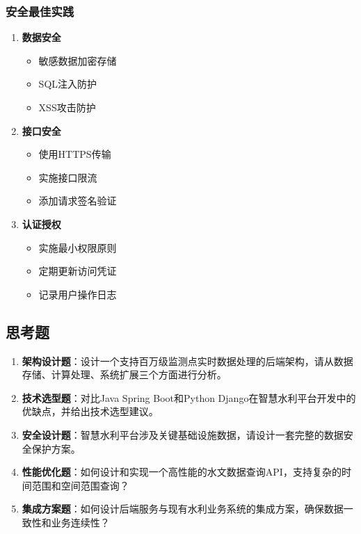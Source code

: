 \subsubsection{安全最佳实践}\label{ux5b89ux5168ux6700ux4f73ux5b9eux8df5}

\begin{enumerate}
\def\labelenumi{\arabic{enumi}.}
\tightlist
\item
  \textbf{数据安全}

  \begin{itemize}
  \tightlist
  \item
    敏感数据加密存储
  \item
    SQL注入防护
  \item
    XSS攻击防护
  \end{itemize}
\item
  \textbf{接口安全}

  \begin{itemize}
  \tightlist
  \item
    使用HTTPS传输
  \item
    实施接口限流
  \item
    添加请求签名验证
  \end{itemize}
\item
  \textbf{认证授权}

  \begin{itemize}
  \tightlist
  \item
    实施最小权限原则
  \item
    定期更新访问凭证
  \item
    记录用户操作日志
  \end{itemize}
\end{enumerate}

\subsection{思考题}\label{ux601dux8003ux9898}

\begin{enumerate}
\def\labelenumi{\arabic{enumi}.}
\item
  \textbf{架构设计题}：设计一个支持百万级监测点实时数据处理的后端架构，请从数据存储、计算处理、系统扩展三个方面进行分析。
\item
  \textbf{技术选型题}：对比Java Spring Boot和Python Django在智慧水利平台开发中的优缺点，并给出技术选型建议。
\item
  \textbf{安全设计题}：智慧水利平台涉及关键基础设施数据，请设计一套完整的数据安全保护方案。
\item
  \textbf{性能优化题}：如何设计和实现一个高性能的水文数据查询API，支持复杂的时间范围和空间范围查询？
\item
  \textbf{集成方案题}：如何设计后端服务与现有水利业务系统的集成方案，确保数据一致性和业务连续性？
\end{enumerate}

